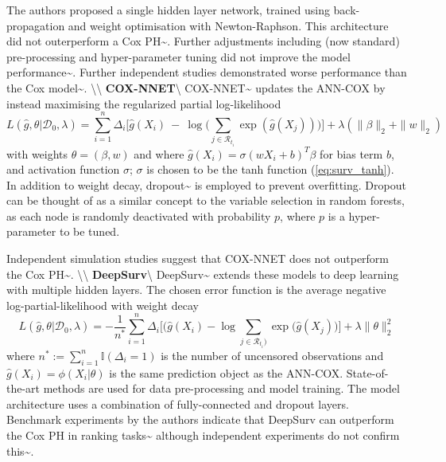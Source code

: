 \documentclass[
  letterpaper,
]{scrbook}
\theoremstyle{plain}
\theoremstyle{definition}
\theoremstyle{remark}
\begin{document}
The authors proposed a single hidden layer network, trained using
back-propagation and weight optimisation with Newton-Raphson. This
architecture did not outerperform a Cox
PH\textasciitilde{}\cite{Faraggi1995}. Further adjustments including
(now standard) pre-processing and hyper-parameter tuning did not improve
the model performance\textasciitilde{}\cite{Mariani1997}. Further
independent studies demonstrated worse performance than the Cox
model\textasciitilde{}\cite{Faraggi1995, Xiang2000}.
\textbackslash\textbackslash{}
\textbf{COX-NNET}\label{mod:coxnnet}\textbackslash{}
COX-NNET\textasciitilde{}\cite{Ching2018a} updates the ANN-COX by
instead maximising the regularized partial log-likelihood \[
L(\hat{g}, \theta|\mathcal{D}_0, \lambda) = \sum^n_{i=1} \Delta_i \Big[\hat{g}(X_i) \ - \ \log\Big(\sum_{j \in \mathcal{R}_{t_i}} \exp(\hat{g}(X_j))\Big)\Big] + \lambda(\|\beta\|_2 + \|w\|_2)
\] with weights \(\theta = (\beta, w)\) and where
\(\hat{g}(X_i) = \sigma(wX_i + b)^T\beta\) for bias term \(b\), and
activation function \(\sigma\); \(\sigma\) is chosen to be the tanh
function (\ref{eq:surv_tanh}). In addition to weight decay,
dropout\textasciitilde{}\cite{Srivastava2014} is employed to prevent
overfitting. Dropout can be thought of as a similar concept to the
variable selection in random forests, as each node is randomly
deactivated with probability \(p\), where \(p\) is a hyper-parameter to
be tuned.

Independent simulation studies suggest that COX-NNET does not outperform
the Cox PH\textasciitilde{}\cite{Gensheimer2019}.
\textbackslash\textbackslash{}
\textbf{DeepSurv}\label{mod:deepsurv}\textbackslash{}
DeepSurv\textasciitilde{}\cite{Katzman2018} extends these models to deep
learning with multiple hidden layers. The chosen error function is the
average negative log-partial-likelihood with weight decay \[
L(\hat{g}, \theta|\mathcal{D}_0, \lambda) = -\frac{1}{n^*} \sum_{i = 1}^n \Delta_i \Big[ \Big(\hat{g}(X_i) - \log \sum_{j \in \mathcal{R}_{t_i})} \exp(\hat{g}(X_j)\Big)\Big] + \lambda\|\theta\|^2_2
\] where \(n^* := \sum^n_{i=1} \mathbb{I}(\Delta_i = 1)\) is the number
of uncensored observations and \(\hat{g}(X_i) = \phi(X_i|\theta)\) is
the same prediction object as the ANN-COX. State-of-the-art methods are
used for data pre-processing and model training. The model architecture
uses a combination of fully-connected and dropout layers. Benchmark
experiments by the authors indicate that DeepSurv can outperform the Cox
PH in ranking tasks\textasciitilde{}\cite{Katzman2016, Katzman2018}
although independent experiments do not confirm
this\textasciitilde{}\cite{Zhao2020}.
\end{document}
